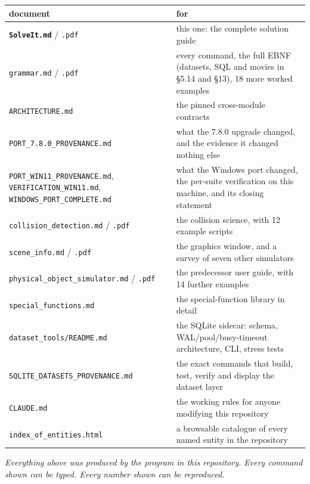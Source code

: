 \documentclass[11pt]{article}
\newcommand{\code}[1]{\texttt{#1}}
\begin{document}
\begin{center}
\begin{tabular}{p{5.2cm}p{9.4cm}}
\textbf{document} & \textbf{for}\\\hline
\textbf{\code{SolveIt.md}} / \code{.pdf} & this one: the complete solution guide\\
\code{grammar.md} / \code{.pdf} & every command, the full EBNF (datasets, SQL and movies in \S5.14 and \S13), 18 more worked examples\\
\code{ARCHITECTURE.md} & the pinned cross-module contracts\\
\code{PORT\_7.8.0\_PROVENANCE.md} & what the 7.8.0 upgrade changed, and the evidence it changed nothing else\\
\code{PORT\_WIN11\_PROVENANCE.md}, \code{VERIFICATION\_WIN11.md}, \code{WINDOWS\_PORT\_COMPLETE.md} & what the Windows port changed, the per-suite verification on this machine, and its closing statement\\
\code{collision\_detection.md} / \code{.pdf} & the collision science, with 12 example scripts\\
\code{scene\_info.md} / \code{.pdf} & the graphics window, and a survey of seven other simulators\\
\code{physical\_object\_simulator.md} / \code{.pdf} & the predecessor user guide, with 14 further examples\\
\code{special\_functions.md} & the special-function library in detail\\
\code{dataset\_tools/README.md} & the SQLite sidecar: schema, WAL/pool/busy-timeout architecture, CLI, stress tests\\
\code{SQLITE\_DATASETS\_PROVENANCE.md} & the exact commands that build, test, verify and display the dataset layer\\
\code{CLAUDE.md} & the working rules for anyone modifying this repository\\
\code{index\_of\_entities.html} & a browsable catalogue of every named entity in the repository\\
\end{tabular}
\end{center}

\vspace{1em}
\begin{center}
\emph{Everything above was produced by the program in this repository.
Every command shown can be typed. Every number shown can be
reproduced.}
\end{center}
\end{document}
